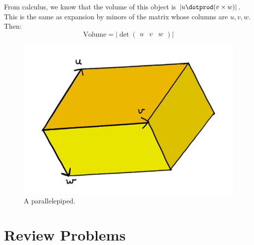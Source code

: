 From calculus, we know that the volume of this object is $|u\dotprod (v\times w)|$.  This is the same as expansion by minors of the matrix whose columns are $u,v,w$.  Then:
\[
\text{Volume}=\big|\det \begin{pmatrix}u & v & w \end{pmatrix} \big|
\] 



\begin{figure}
\begin{center}
\includegraphics[scale=.4]{parallelepiped.jpg}
\caption{A parallelepiped.\label{parallelepiped}}
\end{center}
\end{figure}







\section{Review Problems}


\newpage




